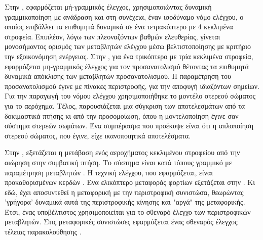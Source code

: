 Στην \cite{6630591}, εφαρμόζεται μή-γραμμικός έλεγχος, χρησιμοποιώντας δυναμική 
γραμμικοποίηση με ανάδραση και στη συνέχεια, έναν ισοδύναμο νόμο ελέγχου, ο 
οποίος επιβάλλει τα επιθυμητά δυναμικά  σε ένα τετρακόπτερο 
με 4 κεκλιμένα στροφεία. Επιπλέον, λόγω των πλεοναζόντων βαθμών ελευθερίας, 
γίνεται μονοσήμαντος ορισμός των μεταβλητών ελέγχου μέσω βελτιστοποίησης με 
κριτήριο την εξοικονόμηση ενέργειας. Στην \cite{KASTELAN201579}, για ένα 
τρικόπτερο με τρία κεκλιμένα στροφεία, εφαρμόζεται μη-γραμμικός έλεγχος για τον 
προσανατολισμό  θέτοντας τα επιθυμητά δυναμικά απόκλισης 
των μεταβλητών προσανατολισμού. Η παραμέτρηση του προσανατολισμού έγινε με 
πίνακες περιστροφής, για την αποφυγή ιδιαζόντων σημείων. Για την παραγωγή του 
νόμου ελέγχου χρησιμοποιήθηκε το μοντέλο στερεού σώματος για το αερόχημα. Τέλος, 
παρουσιάζεται μια σύγκριση των αποτελεσμάτων από τα δοκιμαστικά πτήσης κι από 
την προσομοίωση, όπου η μοντελοποίηση έγινε σαν σύστημα στερεών σωμάτων. Ένα 
συμπέρασμα που προέκυψε είναι ότι η απλοποίηση στερεού σώματος, που έγινε, είχε 
ικανοποιητικά αποτελέσματα.

Στην \cite{4435028}, εξετάζεται η μετάβαση ενός αεροχήματος κεκλιμένου στροφείου
από την αιώρηση στην συμβατική πτήση. Το σύστημα είναι κατά τόπους γραμμικό με
παραμέτρηση μεταβλητών . Η τεχνική ελέγχου, που
εφαρμόζεται, είναι  προκαθορισμένων κερδών .
Ένα ελικόπτερο μεταφοράς φορτίων εξετάζεται στην \cite{6896766}. Κι εδώ, έχει 
αποσυντεθεί η μεταφορική με την περιστροφική συνιστώσα, θεωρώντας 'γρήγορα' 
δυναμικά αυτά της περιστροφικής κίνησης και "αργά" της μεταφορικής. Έτσι, ένας
υποβέλτιστος  χρησιμοποιείται για το σθεναρό έλεγχο των 
περιστροφικών μεταβλητών. Στις μεταφορικές συνιστώσες εφαρμόζεται ένας σθεναρός 
έλεγχος τέλειας παρακολούθησης .


